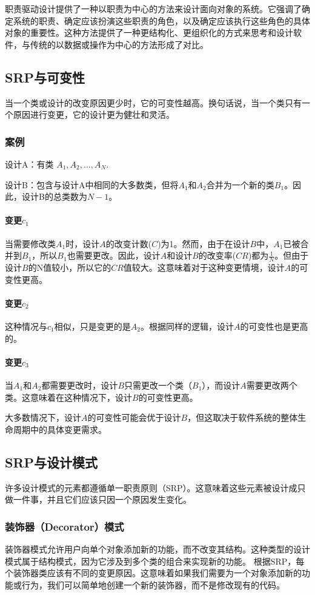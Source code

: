 职责驱动设计提供了一种以职责为中心的方法来设计面向对象的系统。它强调了确定系统的职责、确定应该扮演这些职责的角色，以及确定应该执行这些角色的具体对象的重要性。这种方法提供了一种更结构化、更组织化的方式来思考和设计软件，与传统的以数据或操作为中心的方法形成了对比。

\subsection{SRP与可变性}
当一个类或设计的改变原因更少时，它的可变性越高。换句话说，当一个类只有一个原因进行变更，它的设计更为健壮和灵活。

\subsubsection{案例}
设计A：有类 $A_1, A_2, ... , A_N$.

设计B：包含与设计A中相同的大多数类，但将$A_1$和$A_2$合并为一个新的类$B_1$。因此，设计B的总类数为$N - 1$。

\paragraph{变更$c_1$}当需要修改类$A_1$时，设计$A$的改变计数($C$)为1。然而，由于在设计$B$中，$A_1$已被合并到$B_1$，所以$B_1$也需要更改。因此，设计$A$和设计$B$的改变率($CR$)都为$\frac{1}{N}$。但由于设计$B$的N值较小，所以它的$CR$值较大。这意味着对于这种变更情境，设计$A$的可变性更高。
\paragraph{变更$c_2$}这种情况与$c_1$相似，只是变更的是$A_2$。根据同样的逻辑，设计$A$的可变性也是更高的。
\paragraph{变更$c_3$}当$A_1$和$A_2$都需要更改时，设计$B$只需更改一个类（$B_1$），而设计$A$需要更改两个类。这意味着在这种情况下，设计$B$的可变性更高。

大多数情况下，设计$A$的可变性可能会优于设计$B$，但这取决于软件系统的整体生命周期中的具体变更需求。

\subsection{SRP与设计模式}
许多设计模式的元素都遵循单一职责原则（SRP）。这意味着这些元素被设计成只做一件事，并且它们应该只因一个原因发生变化。
\subsubsection{装饰器（Decorator）模式}
装饰器模式允许用户向单个对象添加新的功能，而不改变其结构。这种类型的设计模式属于结构模式，因为它涉及到多个类的组合来实现新的功能。
根据SRP，每个装饰器类应该有不同的变更原因。这意味着如果我们需要为一个对象添加新的功能或行为，我们可以简单地创建一个新的装饰器，而不是修改现有的代码。
